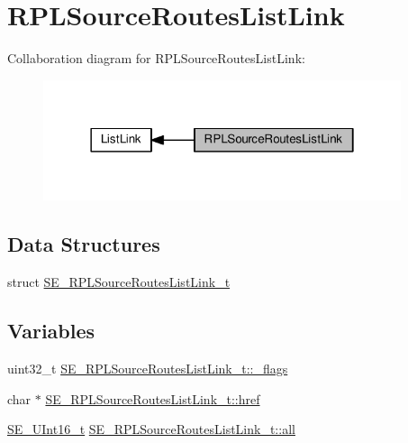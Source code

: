 \hypertarget{group__RPLSourceRoutesListLink}{}\section{R\+P\+L\+Source\+Routes\+List\+Link}
\label{group__RPLSourceRoutesListLink}
Collaboration diagram for R\+P\+L\+Source\+Routes\+List\+Link\+:\nopagebreak
\begin{figure}[H]
\begin{center}
\leavevmode
\includegraphics[width=298pt]{group__RPLSourceRoutesListLink}
\end{center}
\end{figure}
\subsection*{Data Structures}
\begin{DoxyCompactItemize}
\item 
struct \hyperlink{structSE__RPLSourceRoutesListLink__t}{S\+E\+\_\+\+R\+P\+L\+Source\+Routes\+List\+Link\+\_\+t}
\end{DoxyCompactItemize}
\subsection*{Variables}
\begin{DoxyCompactItemize}
\item 
uint32\+\_\+t \hyperlink{group__RPLSourceRoutesListLink_gacc50a570981ab981f8533f4d7d12163e}{S\+E\+\_\+\+R\+P\+L\+Source\+Routes\+List\+Link\+\_\+t\+::\+\_\+flags}
\item 
char $\ast$ \hyperlink{group__RPLSourceRoutesListLink_ga2118dad3467a725136fbaab7690c77a8}{S\+E\+\_\+\+R\+P\+L\+Source\+Routes\+List\+Link\+\_\+t\+::href}
\item 
\hyperlink{group__UInt16_gac68d541f189538bfd30cfaa712d20d29}{S\+E\+\_\+\+U\+Int16\+\_\+t} \hyperlink{group__RPLSourceRoutesListLink_ga13f0e416ff1e772889d728cec3e02672}{S\+E\+\_\+\+R\+P\+L\+Source\+Routes\+List\+Link\+\_\+t\+::all}
\end{DoxyCompactItemize}


